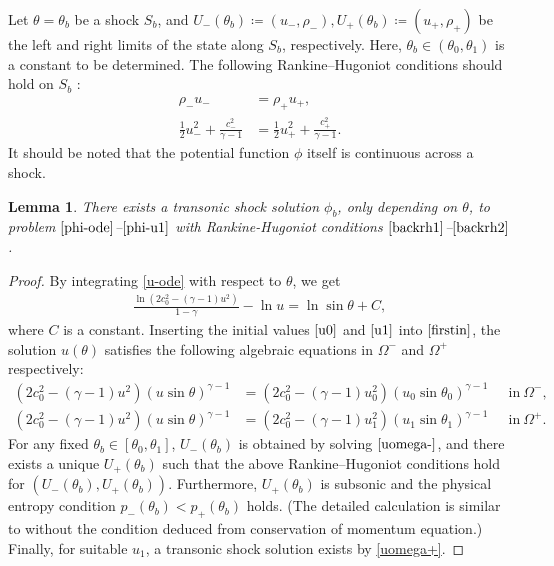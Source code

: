 \documentclass[reqno,12pt]{amsart}
\newtheorem{lemma}{Lemma}[section]
\numberwithin{equation}{section}
\begin{document}
Let $\theta=\theta_b$ be a shock $S_b$, and $U_-(\theta_b)\coloneqq (u_-, \rho_-),U_+(\theta_b) \coloneqq (u_+, \rho_+)$ be the left and right limits of the state along $S_b$, respectively. Here, $\theta_b\in(\theta_0,\theta_1)$ is a constant to be determined. The following Rankine–Hugoniot conditions should hold on $S_b$ :
	\begin{align}
		\rho_-u_-&=\rho_+u_+,\label{backrh1}\\
		\frac{1}{2}u_-^2+\frac{c^2_-}{\gamma-1}&=\frac{1}{2}u_+^2+\frac{c^2_+}{\gamma-1}.\label{backrh2}
	\end{align}
It should be noted that the potential function $\phi$ itself is continuous across a shock. 
	\begin{lemma}\label{solvable}
		There exists a transonic shock solution $\phi_b$, only depending on $\theta$, to problem $\eqref{phi-ode}$--$\eqref{phi-u1}$ with Rankine-Hugoniot conditions $\eqref{backrh1}$--$\eqref{backrh2}$.
	\end{lemma}
\begin{proof}
By integrating \eqref{u-ode} with respect to $\theta$, we get
	\begin{align}\label{firstin}
		\frac{\ln(2c^2_0-(\gamma-1)u^2)}{1-\gamma}-\ln u=\ln \sin\theta +C,
	\end{align}
where $C$ is a constant. Inserting the initial values $\eqref{u0}$ and $\eqref{u1}$ into $\eqref{firstin}$, the solution $u(\theta)$ satisfies the following algebraic equations in $\Omega^-$ and $\Omega^+$ respectively:
	\begin{align}
	(2c^2_0-(\gamma-1)u^2)(u\sin\theta)^{\gamma-1}&=(2c^2_0-(\gamma-1)u^2_0)(u_0\sin\theta_0)^{\gamma-1}~~\quad \text{in}~\Omega^-,\label{uomega-}\\
		(2c^2_0-(\gamma-1)u^2)(u\sin\theta)^{\gamma-1}&=(2c^2_0-(\gamma-1)u^2_1)(u_1\sin\theta_1)^{\gamma-1}~~\quad \text{in}~\Omega^+.\label{uomega+}
	\end{align}
For any fixed $\theta_b\in [\theta_0,\theta_1]$, $U_-(\theta_b)$ is obtained by solving $\eqref{uomega-}$, and there exists a unique $U_+(\theta_b)$  such that the above Rankine–Hugoniot conditions hold for $(U_-(\theta_b), U_+(\theta_b))$. Furthermore, $U_+(\theta_b)$ is subsonic and the physical entropy condition $p_-(\theta_b) < p_+(\theta_b)$ holds. (The detailed calculation is similar to \cite[Proposition 3]{backremarkY} without the condition deduced from conservation of momentum equation.) Finally, for suitable $u_1$,  a transonic shock solution exists by \eqref{uomega+}.
\end{proof}
\end{document}
